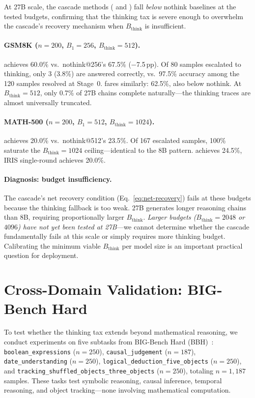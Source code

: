 At 27B scale, the cascade methods (\method{} and \town{}) fall \emph{below} nothink baselines at the tested budgets, confirming that the thinking tax is severe enough to overwhelm the cascade's recovery mechanism when $B_{\text{think}}$ is insufficient.

\paragraph{GSM8K ($n{=}200$, $B_1{=}256$, $B_{\text{think}}{=}512$).}
\method{} achieves 60.0\% vs.\ nothink@256's 67.5\% ($-$7.5\,pp).
Of 80 samples escalated to thinking, only 3 (3.8\%) are answered correctly, vs.\ 97.5\% accuracy among the 120 samples resolved at Stage~0.
\town{} fares similarly: 62.5\%, also below nothink.
At $B_{\text{think}}{=}512$, only 0.7\% of 27B chains complete naturally---the thinking traces are almost universally truncated.

\paragraph{MATH-500 ($n{=}200$, $B_1{=}512$, $B_{\text{think}}{=}1024$).}
\method{} achieves 20.0\% vs.\ nothink@512's 23.5\%.
Of 167 escalated samples, 100\% saturate the $B_{\text{think}}{=}1024$ ceiling---identical to the 8B pattern.
\town{} achieves 24.5\%, IRIS single-round achieves 20.0\%.

\paragraph{Diagnosis: budget insufficiency.}
The cascade's net recovery condition (Eq.~\ref{eq:net-recovery}) fails at these budgets because the thinking fallback is too weak.
27B generates longer reasoning chains than 8B, requiring proportionally larger $B_{\text{think}}$.
\emph{Larger budgets ($B_{\text{think}}{=}2048$ or $4096$) have not yet been tested at 27B}---we cannot determine whether the cascade fundamentally fails at this scale or simply requires more thinking budget.
Calibrating the minimum viable $B_{\text{think}}$ per model size is an important practical question for deployment.

\section{Cross-Domain Validation: BIG-Bench Hard}
\label{app:bbh}

To test whether the thinking tax extends beyond mathematical reasoning, we
conduct experiments on five subtasks from BIG-Bench Hard
(BBH)~\citep{suzgun2023challenging}: \texttt{boolean\_expressions} ($n{=}250$),
\texttt{causal\_judgement} ($n{=}187$), \texttt{date\_understanding} ($n{=}250$),
\texttt{logical\_deduction\_five\_objects} ($n{=}250$), and
\texttt{tracking\_shuffled\_objects\_three\_objects} ($n{=}250$),
totaling $n{=}1{,}187$ samples.
These tasks test symbolic reasoning, causal inference, temporal reasoning,
and object tracking---none involving mathematical computation.

